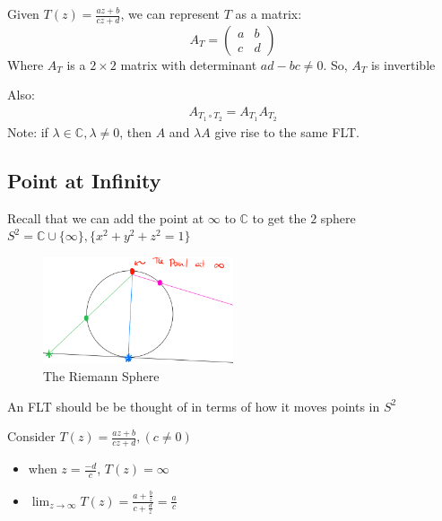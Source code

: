 \begin{theorem}
    Given $T(z) = \frac{az + b}{cz + d}$, we can represent $T$ as a matrix:
    $$A_T = \begin{pmatrix}
            a & b \\
            c & d
        \end{pmatrix}$$
    Where $A_T$ is a $2 \times 2$ matrix with determinant $ad - bc \neq 0$. So, $A_T$ is invertible
\end{theorem}

\begin{remark}
    Also:
    \begin{align*}
        A_{T_1 \circ T_2} = A_{T_1}A_{T_2}
    \end{align*}
    Note: if $\lambda \in \mathbb{C}, \lambda \neq 0$, then $A$ and $\lambda A$ give rise to the same FLT.
\end{remark}

\subsection{Point at Infinity}
\begin{definition}
    Recall that we can add the point at $\infty$ to $\mathbb{C}$ to get the $2$ sphere $S^2 = \mathbb{C} \cup \{\infty\}, \{x^2 + y^2 + z^2 = 1\}$
\end{definition}

\begin{figure}[H]
    \centering
    \includegraphics[width=0.5\textwidth]{LECTURE_15/s2.png}
    \caption{The Riemann Sphere}
\end{figure}

\begin{remark}
    An FLT should be be thought of in terms of how it moves points in $S^2$
\end{remark}

\begin{theorem}
    Consider $T(z) = \frac{a z + b}{c z + d}, (c \neq 0)$
    \begin{itemize}
        \item when $z = \frac{-d}{c}$, $T(z) = \infty$
        \item $\lim_{z \to \infty} T(z) = \frac{a + \frac{b}{z}}{c + \frac{d}{z}} = \frac{a}{c}$
    \end{itemize}
\end{theorem}


